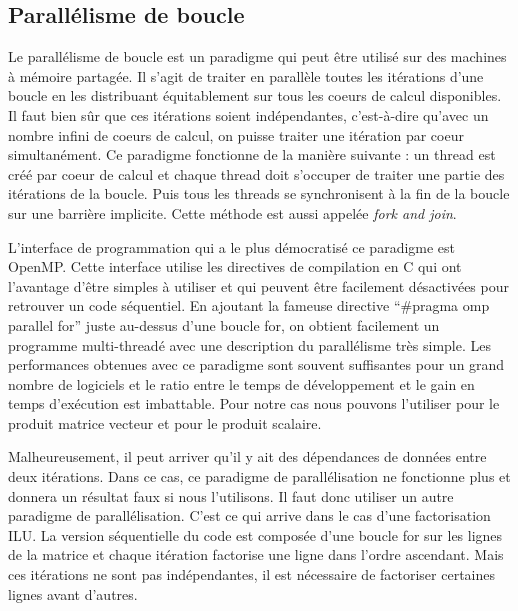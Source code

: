 \subsection{Parallélisme de boucle}
Le parallélisme de boucle est un paradigme qui peut être utilisé sur des machines à mémoire partagée.
%
Il s'agit de traiter en parallèle toutes les itérations d'une boucle en les distribuant équitablement sur tous les coeurs de calcul disponibles.
%
Il faut bien sûr que ces itérations soient indépendantes, c'est-à-dire qu'avec un nombre infini de coeurs de calcul, on puisse traiter une itération par coeur simultanément.
%
Ce paradigme fonctionne de la manière suivante : un thread est créé par coeur de calcul et chaque thread doit s'occuper de traiter une partie des itérations de la boucle.
%
Puis tous les threads se synchronisent à la fin de la boucle sur une barrière implicite.
%
Cette méthode est aussi appelée {\em fork and join}.

L'interface de programmation qui a le plus démocratisé ce paradigme est OpenMP.
%
Cette interface utilise les directives de compilation en C qui ont l'avantage d'être simples à utiliser et qui peuvent être facilement désactivées pour retrouver un code séquentiel.
%
En ajoutant la fameuse directive ``\#pragma omp parallel for'' juste au-dessus d'une boucle for, on obtient facilement un programme multi-threadé avec une description du parallélisme très simple.
%
Les performances obtenues avec ce paradigme sont souvent suffisantes pour un grand nombre de logiciels et le ratio entre le temps de développement et le gain en temps d'exécution est imbattable.
%
Pour notre cas nous pouvons l'utiliser pour le produit matrice vecteur et pour le produit scalaire.

Malheureusement, il peut arriver qu'il y ait des dépendances de données entre deux itérations.
%
Dans ce cas, ce paradigme de parallélisation ne fonctionne plus et donnera un résultat faux si nous l'utilisons.
%
Il faut donc utiliser un autre paradigme de parallélisation.
%
C'est ce qui arrive dans le cas d'une factorisation ILU.
%
La version séquentielle du code est composée d'une boucle for sur les lignes de la matrice et chaque itération factorise une ligne dans l'ordre ascendant.
%
Mais ces itérations ne sont pas indépendantes, il est nécessaire de factoriser certaines lignes avant d'autres.
